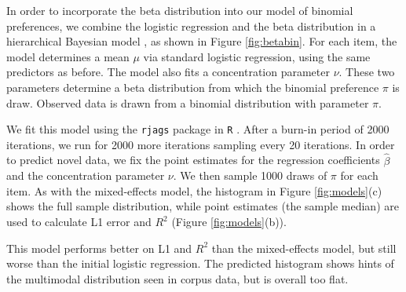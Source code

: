 \documentclass[10pt,letterpaper]{article}
\begin{document}
In order to incorporate the beta distribution into our model of binomial preferences, we combine the logistic regression and the beta distribution in a hierarchical Bayesian model \citep{Gelman:2013un}, as shown in Figure \ref{fig:betabin}. For each item, the model determines a mean $\mu$ via standard logistic regression, using the same predictors as before. The model also fits a concentration parameter $\nu$. These two parameters determine a beta distribution from which the binomial preference $\pi$ is draw. Observed data is drawn from a binomial distribution with parameter $\pi$.

We fit this model using the {\tt rjags} package in {\tt R} \citep{Plummer:9TeVGfAZ}. After a burn-in period of 2000 iterations, we run for 2000 more iterations sampling every 20 iterations. In order to predict novel data, we fix the point estimates for the regression coefficients $\hat{\beta}$ and the concentration parameter $\nu$. We then sample 1000 draws of $\pi$ for each item. As with the mixed-effects model, the histogram in Figure \ref{fig:models}(c) shows the full sample distribution, while point estimates (the sample median) are used to calculate L1 error and $R^{2}$ (Figure \ref{fig:models}(b)).

This model performs better on L1 and $R^{2}$ than the mixed-effects model, but still worse than the initial logistic regression. The predicted histogram shows hints of the multimodal distribution seen in corpus data, but is overall too flat.
\end{document}
